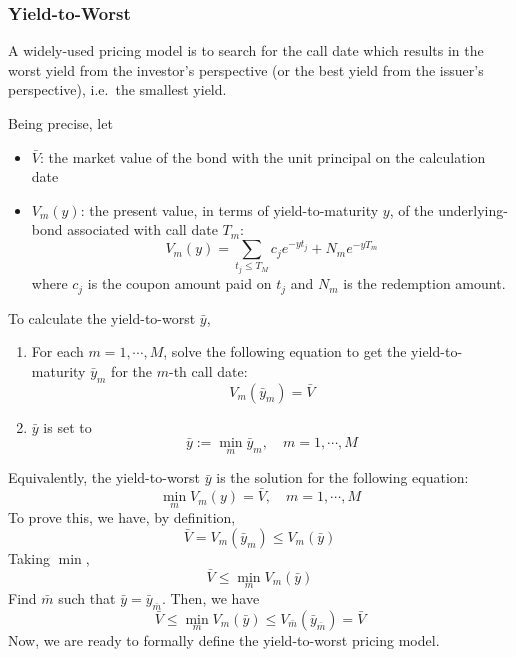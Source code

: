 \documentclass[10pt,a4paper]{article}
\begin{document}
\subsubsection{Yield-to-Worst}
\label{sec:yield-to-worst}

A widely-used pricing model is to search for the call date which results in the worst yield from the investor's perspective (or the best yield from the issuer's perspective), i.e.\ the smallest yield. 

Being precise, let
\begin{itemize}
	\item $\bar{V}$: the market value of the bond with the unit principal on the calculation date
	\item $V_m(y)$: the present value, in terms of yield-to-maturity $y$, of the underlying-bond associated with call date $T_m$: 
	\begin{equation}
	V_m(y) = \sum_{t_j \le T_M} c_j  e^{-yt_j} + N_m e^{-yT_m}
	\label{eqn:valuation-non-callable-bond}
	\end{equation}
	where $c_j$ is the coupon amount paid on $t_j$ and $N_m$ is the redemption amount. 
\end{itemize}

To calculate the yield-to-worst $\bar{y}$, 
\begin{enumerate}
	\item For each $m = 1, \cdots, M$, solve the following equation to get the yield-to-maturity $\bar{y}_m$ for the $m$-th call date:
	\begin{equation}
	V_m(\bar{y}_m) = \bar{V}
	\end{equation}
	\item $\bar{y}$ is set to
	\begin{equation}
	\bar{y} := \min_m \bar{y}_m, \quad m = 1, \cdots, M
	\end{equation}
\end{enumerate}

Equivalently, the yield-to-worst $\bar{y}$ is the solution for the following equation:
\begin{equation}
\min_{m} V_m(y) = \bar{V}, \quad m = 1, \cdots, M
\end{equation}
To prove this, we have, by definition, 
\begin{equation}
\bar{V} = V_m(\bar{y}_m) \le V_m(\bar{y})
\end{equation}
Taking $\min$, 
\begin{equation}
\bar{V} \le \min_m V_m(\bar{y})
\end{equation}
Find $\bar{m}$ such that $\bar{y} = \bar{y}_{\bar{m}}$. Then, we have
\begin{equation}
\bar{V} \le \min_m V_m(\bar{y}) \le V_{\bar{m}}(\bar{y}_{\bar{m}}) = \bar{V}
\end{equation}
Now, we are ready to formally define the yield-to-worst pricing model. 
\end{document}
